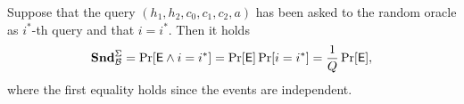 Suppose that the query $(h_1, h_2,c_0,c_1,c_2,a)$ has been asked to the random oracle as $i^*$-th query and that $i=i^*$. Then it holds
\[\mathbf{Snd}^\Sigma_{\mathcal{B}} = \Pr[\mathsf{E} \land i=i^*] = \Pr[\mathsf{E}]\Pr[i=i^*] = \frac{1}{Q}\Pr[\mathsf{E}],\]
where the first equality holds since the events are independent.

%


%



